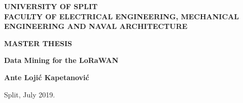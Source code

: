 \begin{titlepage}
    \begin{center}
        
        \Large
        \textbf{UNIVERSITY OF SPLIT\\
        FACULTY OF ELECTRICAL ENGINEERING, MECHANICAL ENGINEERING AND NAVAL ARCHITECTURE}

        \vspace{4cm}

        \textbf{MASTER THESIS}

        \vspace{3cm}
        
        \Huge
        \textbf{Data Mining for the LoRaWAN}

        \vspace{5cm}

        \Large 
        \textbf{Ante Lojić Kapetanović}

        \vfill

        \large
        Split, July 2019.

    \end{center}
\end{titlepage}